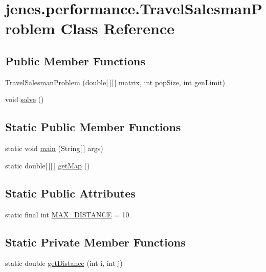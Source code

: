 \hypertarget{classjenes_1_1performance_1_1_travel_salesman_problem}{\section{jenes.\-performance.\-Travel\-Salesman\-Problem Class Reference}
\label{classjenes_1_1performance_1_1_travel_salesman_problem}
}
\subsection*{Public Member Functions}
\begin{DoxyCompactItemize}
\item 
\hyperlink{classjenes_1_1performance_1_1_travel_salesman_problem_a1c5f34122ccb13c01584d05f0c7a1d61}{Travel\-Salesman\-Problem} (double\mbox{[}$\,$\mbox{]}\mbox{[}$\,$\mbox{]} matrix, int pop\-Size, int gen\-Limit)
\item 
void \hyperlink{classjenes_1_1performance_1_1_travel_salesman_problem_a2f0d24ae04735fe7926f2b647809692d}{solve} ()
\end{DoxyCompactItemize}
\subsection*{Static Public Member Functions}
\begin{DoxyCompactItemize}
\item 
static void \hyperlink{classjenes_1_1performance_1_1_travel_salesman_problem_ab2888d221761235635b6909357f6647c}{main} (String\mbox{[}$\,$\mbox{]} args)
\item 
static double\mbox{[}$\,$\mbox{]}\mbox{[}$\,$\mbox{]} \hyperlink{classjenes_1_1performance_1_1_travel_salesman_problem_a0a22dfc28881be8cf6a73e8f90a169e1}{get\-Map} ()
\end{DoxyCompactItemize}
\subsection*{Static Public Attributes}
\begin{DoxyCompactItemize}
\item 
static final int \hyperlink{classjenes_1_1performance_1_1_travel_salesman_problem_aceff750d55c6086531bf25b73289ac4e}{M\-A\-X\-\_\-\-D\-I\-S\-T\-A\-N\-C\-E} = 10
\end{DoxyCompactItemize}
\subsection*{Static Private Member Functions}
\begin{DoxyCompactItemize}
\item 
static double \hyperlink{classjenes_1_1performance_1_1_travel_salesman_problem_afa5adfef7c9b405ec67ac20582c59945}{get\-Distance} (int i, int j)
\end{DoxyCompactItemize}
